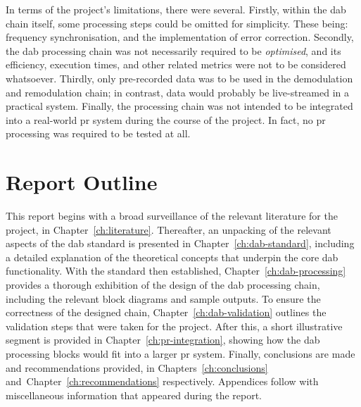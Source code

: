 \documentclass[class=report,11pt,crop=false]{standalone}
\begin{document}
In terms of the project's limitations, there were several. Firstly, within the \gls{dab} chain itself, some processing steps could be omitted for simplicity. These being: frequency synchronisation, and the implementation of error correction. Secondly, the \gls{dab} processing chain was not necessarily required to be \emph{optimised}, and its efficiency, execution times, and other related metrics were not to be considered whatsoever. Thirdly, only pre-recorded data was to be used in the demodulation and remodulation chain; in contrast, data would probably be live-streamed in a practical system. Finally, the processing chain was not intended to be integrated into a real-world \gls{pr} system during the course of the project. In fact, no \gls{pr} processing was required to be tested at all.

\section{Report Outline}
This report begins with a broad surveillance of the relevant literature for the project, in Chapter~\ref{ch:literature}. Thereafter, an unpacking of the relevant aspects of the \gls{dab} standard is presented in Chapter~\ref{ch:dab-standard}, including a detailed explanation of the theoretical concepts that underpin the core \gls{dab} functionality. With the standard then established, Chapter~\ref{ch:dab-processing} provides a thorough exhibition of the design of the \gls{dab} processing chain, including the relevant block diagrams and sample outputs. To ensure the correctness of the designed chain, Chapter~\ref{ch:dab-validation} outlines the validation steps that were taken for the project. After this, a short illustrative segment is provided in Chapter~\ref{ch:pr-integration}, showing how the \gls{dab} processing blocks would fit into a larger \gls{pr} system. Finally, conclusions are made and recommendations provided, in Chapters~\ref{ch:conclusions} and~Chapter~\ref{ch:recommendations} respectively. Appendices follow with miscellaneous information that appeared during the report.



\ifstandalone

\printnoidxglossary[type=\acronymtype,nonumberlist]
\fi
\end{document}
